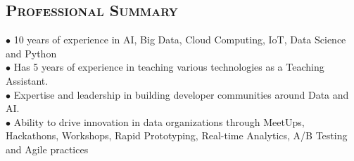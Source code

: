 \begin{resume}


\section{\textsc{Professional Summary}}
$\bullet$ 10 years of experience in AI, Big Data, Cloud Computing, IoT, Data Science and Python\\
$\bullet$ Has 5 years of experience in teaching various technologies as a Teaching Assistant.\\
$\bullet$ Expertise and leadership in building developer communities around Data and AI.\\
$\bullet$ Ability to drive innovation in data organizations through MeetUps, Hackathons, Workshops, Rapid Prototyping, Real-time Analytics, A/B Testing and Agile practices



\end{resume}
